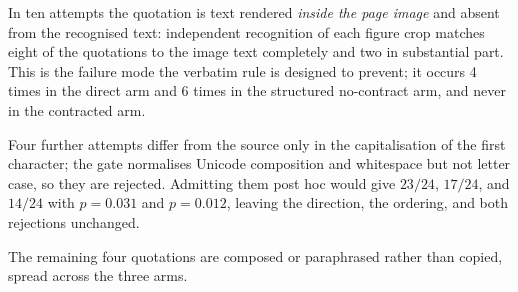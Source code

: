 In ten attempts the quotation is text rendered \emph{inside the page
image} and absent from the recognised text: independent recognition of
each figure crop matches eight of the quotations to the image text
completely and two in substantial part. This is the failure mode the
verbatim rule is designed to prevent; it occurs 4 times in the direct
arm and 6 times in the structured no-contract arm, and never in the
contracted arm.

Four further attempts differ from the source only in the
capitalisation of the first character; the gate normalises Unicode
composition and whitespace but not letter case, so they are rejected.
Admitting them post hoc would give $23/24$, $17/24$, and $14/24$ with
$p=0.031$ and $p=0.012$, leaving the direction, the ordering, and both
rejections unchanged.

The remaining four quotations are composed or paraphrased rather than
copied, spread across the three arms.
